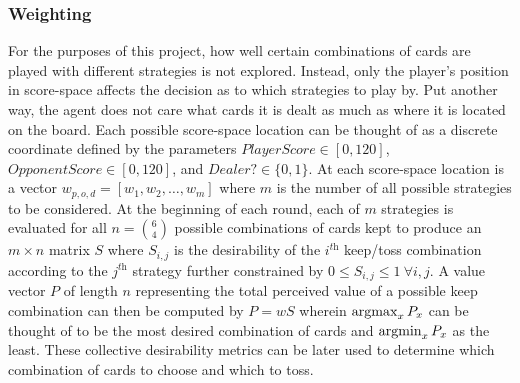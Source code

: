 

\subsubsection{Weighting}
\label{sec:dm-methods-weighting}



For the purposes of this project,
how well certain combinations of cards are played with different strategies
is not explored.
%
Instead, only the player's position in score-space affects the decision as to
which strategies to play by.
%
Put another way, the agent does not care what cards it is dealt as much as where
it is located on the board.
%
Each possible score-space location can be thought of as a discrete coordinate
defined by the parameters
$\textit{PlayerScore} \in [0, 120]$,
$\textit{OpponentScore} \in [0, 120]$,
and
$\textit{Dealer?} \in \{0,1\}$.
%
At each score-space location is a vector $w_{p,o,d} = [w_1,w_2,\ldots,w_m]$
where $m$ is the number of all possible strategies to be considered.
At the beginning of each round, each of $m$ strategies is evaluated for all
$n = {6 \choose 4}$ possible combinations of cards kept to produce an
$m \times n$ matrix $S$
where $S_{i,j}$ is the desirability of the $i^{\textit{th}}$ keep/toss
combination according to the $j^{\textit{th}}$ strategy
further constrained by
$0 \le S_{i,j} \le 1\ \forall i,j$.
%
A value vector $P$ of length $n$ representing the total perceived value of a
possible keep combination
can then be computed by
$P = w S$
wherein $\operatorname*{argmax}_{x}{P_x}$ can be thought of to be the most desired combination
of cards and $\operatorname*{argmin}_{x}{P_x}$ as the least.
%
These collective desirability metrics can be later used to determine which
combination of cards to choose and which to toss.




